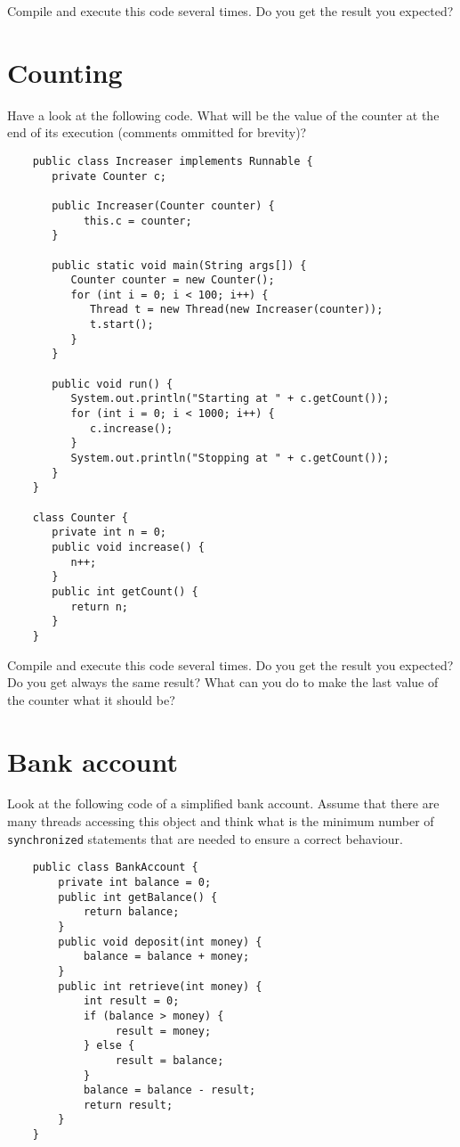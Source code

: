\documentclass{article}
\begin{document}
Compile and execute this code several times. Do you get the result you
expected? 

\section{Counting}
\label{sec:counter}

Have a look at the following code. What will be the value of the
counter at the end of its execution (comments ommitted for brevity)? 

\begin{verbatim}
    public class Increaser implements Runnable {
       private Counter c;
    
       public Increaser(Counter counter) {
            this.c = counter;
       }
    
       public static void main(String args[]) {
          Counter counter = new Counter();
          for (int i = 0; i < 100; i++) {
             Thread t = new Thread(new Increaser(counter));
             t.start();
          }
       }
    
       public void run() {
          System.out.println("Starting at " + c.getCount());
          for (int i = 0; i < 1000; i++) {
             c.increase();
          }
          System.out.println("Stopping at " + c.getCount());
       }
    }
    
    class Counter {
       private int n = 0;
       public void increase() {
          n++;
       }
       public int getCount() {
          return n;
       }
    }
\end{verbatim}

Compile and execute this code several times. Do you get the result you
expected? Do you get always the same result? What can you do to make
the last value of the counter what it should be?

\section{Bank account}
\label{sec:bank-account}

Look at the following code of a simplified bank account. Assume that
there are many threads accessing this object and think what is the
minimum number of \verb+synchronized+ statements that are needed to
ensure a correct behaviour. 

\begin{verbatim}
    public class BankAccount {
        private int balance = 0;
        public int getBalance() {
            return balance;
        }
        public void deposit(int money) {
            balance = balance + money;
        }
        public int retrieve(int money) {
            int result = 0;
            if (balance > money) {
                 result = money;
            } else {
                 result = balance;
            }
            balance = balance - result;
            return result;
        }
    }
\end{verbatim}
\end{document}
